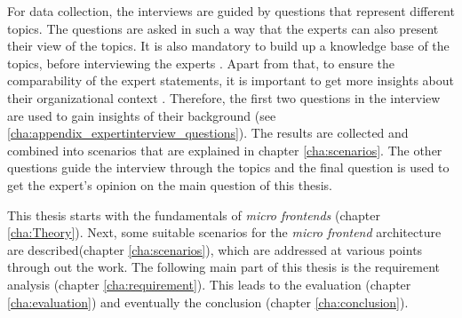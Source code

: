 For data collection, the interviews are guided by questions that represent different topics.
The questions are asked in such a way that the experts can also present their view of the topics.
It is also mandatory to build up a knowledge base of the topics, before interviewing the experts \cite[p.~31]{AlexanderBognerBeateLittigWolfgangMenz.2009}.
Apart from that, to ensure the comparability of the expert statements, it is important to get more insights about their organizational context \cite[p.~35]{AlexanderBognerBeateLittigWolfgangMenz.2009}.
Therefore, the first two questions in the interview are used to gain insights of their background (see \ref{cha:appendix_expertinterview_questions}).
The results are collected and combined into scenarios that are explained in chapter \ref{cha:scenarios}.
The other questions guide the interview through the topics and the final question is used to get the expert's opinion on the main question of this thesis.



This thesis starts with the fundamentals of \textit{micro frontends} (chapter \ref{cha:Theory}).
Next, some suitable scenarios for the \textit{micro frontend} architecture are described(chapter \ref{cha:scenarios}), which are addressed at various points through out the work.
The following main part of this thesis is the requirement analysis (chapter \ref{cha:requirement}).
This leads to the evaluation (chapter \ref{cha:evaluation}) and eventually the conclusion (chapter \ref{cha:conclusion}).
